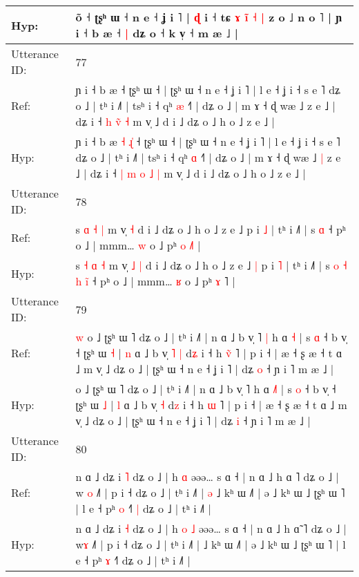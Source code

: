 \documentclass[10pt]{article}
\DeclareRobustCommand{\hl}[1]{{\textcolor{red}{#1}}}
\begin{document}
\begin{longtable}{ll}
 \\
Hyp: & õ ˧ ʈʂʰ ɯ ˧ n e ˧ ʝ i ˥ | \hl{}\hl{ɖ} i ˧ tɕ\hl{ }\hl{ɤ} \hl{i}\hl{̃}\hl{ }\hl{˧}\hl{ }\hl{|} z o ˩ n o ˥ | ɲ i ˧ b æ ˧\hl{ }\hl{|} dʑ o ˧ k v̩ ˧\hl{}\hl{}\hl{} m æ ˩ |
 \\
\midrule
Utterance ID: & 77 \\
Ref: & ɲ i ˧ b æ\hl{}\hl{}\hl{}\hl{}\hl{} ˧ ʈʂʰ ɯ ˧ | ʈʂʰ ɯ ˧ n e ˧ ʝ i ˥ | l e ˧ ʝ i ˧ s e ˥ dʑ o ˩ | tʰ i ˩˥ | tsʰ i ˧ qʰ \hl{æ} ˧˥ | dʑ o ˩ | m ɤ ˧ ɖ wæ ˩\hl{}\hl{} z e ˩ | dʑ i ˧\hl{}\hl{} \hl{h} \hl{}\hl{v}\hl{̃} \hl{˧} m v̩ ˩ d i ˩ dʑ o ˩ h o ˩ z e ˩ |
 \\
Hyp: & ɲ i ˧ b æ\hl{ }\hl{˧}\hl{ }\hl{ɻ}\hl{̍} ˧ ʈʂʰ ɯ ˧ | ʈʂʰ ɯ ˧ n e ˧ ʝ i ˥ | l e ˧ ʝ i ˧ s e ˥ dʑ o ˩ | tʰ i ˩˥ | tsʰ i ˧ qʰ \hl{ɑ} ˧˥ | dʑ o ˩ | m ɤ ˧ ɖ wæ ˩\hl{ }\hl{|} z e ˩ | dʑ i ˧\hl{ }\hl{|} \hl{m} \hl{o}\hl{ }\hl{˩} \hl{|} m v̩ ˩ d i ˩ dʑ o ˩ h o ˩ z e ˩ |
 \\
\midrule
Utterance ID: & 78 \\
Ref: & s \hl{ɑ} \hl{˧} \hl{|} m v̩\hl{}\hl{} \hl{˧} d i ˩ dʑ o ˩ h o ˩ z e ˩\hl{}\hl{} p i \hl{˩} | tʰ i ˩˥ | s\hl{}\hl{}\hl{}\hl{}\hl{}\hl{} \hl{}\hl{ɑ} ˧ pʰ o ˩ | mmm… \hl{w} o ˩ pʰ \hl{o} \hl{˩}˥ |
 \\
Hyp: & s \hl{˧} \hl{ɑ} \hl{˧} m v̩\hl{ }\hl{˩} \hl{|} d i ˩ dʑ o ˩ h o ˩ z e ˩\hl{ }\hl{|} p i \hl{˥} | tʰ i ˩˥ | s\hl{ }\hl{o}\hl{ }\hl{˧}\hl{ }\hl{h} \hl{i}\hl{̃} ˧ pʰ o ˩ | mmm… \hl{ʁ} o ˩ pʰ \hl{ɤ} \hl{}˥ |
 \\
\midrule
Utterance ID: & 79 \\
Ref: & \hl{w}\hl{ }o ˩ ʈʂʰ ɯ ˥ dʑ o ˩ | tʰ i ˩˥ | n ɑ ˩ b v̩ ˥\hl{ }\hl{|} h ɑ \hl{}\hl{˧} | s \hl{ɑ} ˧ b v̩ ˧ ʈʂʰ ɯ \hl{˧} | \hl{n} ɑ ˩ b v̩\hl{ }\hl{˥} \hl{|} d\hl{ʑ} i ˧ h \hl{v}\hl{̃} ˥ | p i ˧ | æ ˧ ʂ æ ˧ t ɑ ˩ m v̩ ˩ dʑ o ˩ | ʈʂʰ ɯ ˧ n e ˧ ʝ i ˥ | dʑ \hl{o} ˧ ɲ i ˥ m æ ˩ |
 \\
Hyp: & \hl{}\hl{}o ˩ ʈʂʰ ɯ ˥ dʑ o ˩ | tʰ i ˩˥ | n ɑ ˩ b v̩ ˥\hl{}\hl{} h ɑ \hl{˩}\hl{˥} | s \hl{o} ˧ b v̩ ˧ ʈʂʰ ɯ \hl{˩} | \hl{l} ɑ ˩ b v̩\hl{}\hl{} \hl{˧} d\hl{z} i ˧ h \hl{}\hl{ɯ} ˥ | p i ˧ | æ ˧ ʂ æ ˧ t ɑ ˩ m v̩ ˩ dʑ o ˩ | ʈʂʰ ɯ ˧ n e ˧ ʝ i ˥ | dʑ \hl{i} ˧ ɲ i ˥ m æ ˩ |
 \\
\midrule
Utterance ID: & 80 \\
Ref: & n ɑ ˩ dʑ i \hl{˥} dʑ o ˩ | h\hl{}\hl{} \hl{ɑ} əəə… s ɑ ˧ | n ɑ ˩ h ɑ\hl{} ˥ dʑ o ˩ | w\hl{ }\hl{o} ˩˥ | p i ˧ dʑ o ˩ | tʰ i ˩˥ |\hl{ }\hl{ə} ˩ kʰ ɯ ˩˥ | ə ˩ kʰ ɯ ˩ ʈʂʰ ɯ ˥ | l e ˧ pʰ \hl{o} ˧˥\hl{ }\hl{|} dʑ o ˩ | tʰ i ˩˥ |
 \\
Hyp: & n ɑ ˩ dʑ i \hl{˧} dʑ o ˩ | h\hl{ }\hl{o} \hl{˩} əəə… s ɑ ˧ | n ɑ ˩ h ɑ\hl{̃} ˥ dʑ o ˩ | w\hl{}\hl{ɤ} ˩˥ | p i ˧ dʑ o ˩ | tʰ i ˩˥ |\hl{}\hl{} ˩ kʰ ɯ ˩˥ | ə ˩ kʰ ɯ ˩ ʈʂʰ ɯ ˥ | l e ˧ pʰ \hl{ɤ} ˧˥\hl{}\hl{} dʑ o ˩ | tʰ i ˩˥ |

\end{longtable}
\end{document}
